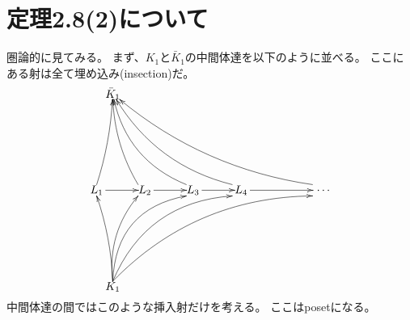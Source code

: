 \documentclass[a4j]{jarticle}
\begin{document}
    \section{定理2.8(2)について}
    圏論的に見てみる。
    まず、$K_1$と$\bar{K}_1$の中間体達を以下のように並べる。
    ここにある射は全て埋め込み(insection)だ。
    \[
    \begin{xy}
        (00, 30)    *{L_1}="L1",
        (15, 30)    *{L_2}="L2",
        (30, 30)    *{L_3}="L3",
        (45, 30)    *{L_4}="L4",
        (70, 30)    *{~\dots}="Li",
        (5, 60)     *{\bar{K}_1}="cK1",
        (5, 00)     *{K_1}="K1",

        \ar@{->}            "L1"+<0.8em,0em>;"L2"
        \ar@{->}            "L2"+<0.8em,0em>;"L3"
        \ar@{->}            "L3"+<0.8em,0em>;"L4"
        \ar@{->}            "L4"+<0.8em,0em>;"Li"

        \ar@{->}@/_{1mm}/ "K1"+<0.0em,0.5em>;"L1"+<-0.0em,-0.5em>
        \ar@{->}@/^{3mm}/ "K1"+<0.0em,0.5em>;"L2"+<-0.6em,-0.5em>
        \ar@{->}@/^{7mm}/ "K1"+<0.0em,0.5em>;"L3"+<-0.6em,-0.5em>
        \ar@{->}@/^{7mm}/ "K1"+<0.0em,0.5em>;"L4"+<-0.8em,-0.5em>
        \ar@{->}@/^{7mm}/ "K1"+<0.0em,0.5em>;"Li"+<-0.8em,-0.5em>
        \ar@{->}@/_{1mm}/ "L1"+<-0.0em,0.5em>;"cK1"
        \ar@{->}@/^{2mm}/ "L2"+<-0.6em,0.5em>;"cK1"
        \ar@{->}@/^{5mm}/ "L3"+<-0.6em,0.5em>;"cK1"
        \ar@{->}@/^{5mm}/ "L4"+<-0.8em,0.5em>;"cK1"
        \ar@{->}@/^{5mm}/ "Li"+<-0.8em,0.5em>;"cK1"
    \end{xy}
    \]
    中間体達の間ではこのような挿入射だけを考える。
    ここはposetになる。
\end{document}
